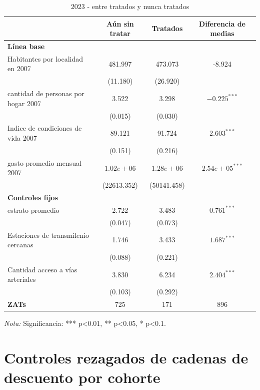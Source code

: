 \documentclass{article}
\begin{document}
\begin{table} [H]
  \centering
  \caption{2023 - entre tratados y nunca tratados}
  \label{tab:comparacion_tratamientos}
  \begin{tabular}{l c c c}
    \toprule
    & \textbf{Aún sin tratar} & \textbf{Tratados} & \textbf{Diferencia de medias} \\
    \midrule
    \multicolumn{4}{l}{\textbf{Línea base}} \\
    \midrule
    Habitantes por localidad en 2007 & 481.997 & 473.073 & -8.924 \\
    & (11.180) & (26.920) & \\
    cantidad de personas por hogar 2007 & 3.522 & 3.298 & $-0.225^{***}$ \\
    & (0.015) & (0.030) & \\
    Indice de condiciones de vida 2007 & 89.121 & 91.724 & $2.603^{***}$ \\
    & (0.151) & (0.216) & \\
    gasto promedio mensual 2007 & $1.02e+06$ & $1.28e+06$ & $2.54e+05^{***}$ \\
    & (22613.352) & (50141.458) & \\
    \midrule
    \multicolumn{4}{l}{\textbf{Controles fijos}} \\
    \midrule
    estrato promedio & 2.722 & 3.483 & $0.761^{***}$ \\
    & (0.047) & (0.073) & \\
     Estaciones de transmilenio cercanas & 1.746 & 3.433 & $1.687^{***}$ \\
    & (0.088) & (0.221) & \\
    Cantidad acceso a vías arteriales & 3.830 & 6.234 & $2.404^{***}$ \\
    & (0.103) & (0.292) & \\
    \midrule
    \midrule
    \textbf{ZATs} & 725 & 171 & 896 \\
    \bottomrule
  \end{tabular}
  \parbox[t]{\textwidth}{%
    \vspace{0.5em}
    \footnotesize{ \textit{Nota:} Significancia: *** p<0.01, ** p<0.05, * p<0.1.}}
\end{table}

\section{Controles rezagados de cadenas de descuento por cohorte}
\label{sec:controles_cadenas_descuento}
\end{document}
